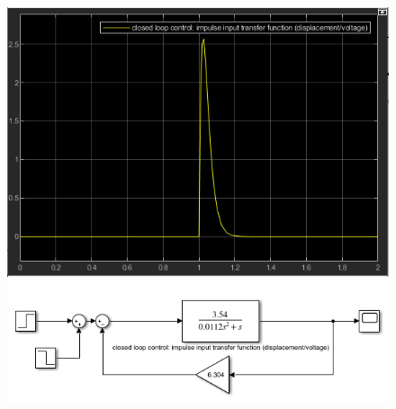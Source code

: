 \documentclass[conference]{IEEEtran}
\begin{document}
\begin{figure}[htbp]
    \centering
    \begin{minipage}[b]{0.24\textwidth}
        \includegraphics[width=\textwidth]{./Graph/G7'.png}
        \caption{}
    \end{minipage}
    \hfill
    \begin{minipage}[b]{0.24\textwidth}
        \centering
        \includegraphics[width=\textwidth]{./Graph/G7.png}
        \caption{}
    \end{minipage}
\end{figure}
\end{document}
